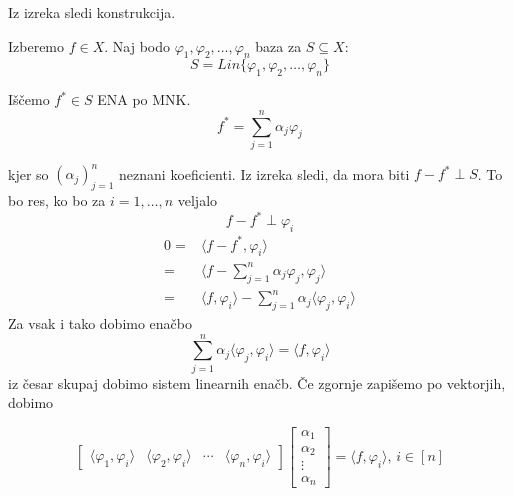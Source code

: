 \documentclass[a4paper,12pt]{article}
\newcommand{\innerproduct}[2]{\langle #1, #2 \rangle}
\theoremstyle{definition}
\theoremstyle{remark}
\begin{document}
Iz izreka sledi konstrukcija.

Izberemo $f \in X$. Naj bodo $\varphi_1, \varphi_2, \dots, \varphi_n$ baza za $S \subseteq X$:
\begin{equation*}
    S = Lin\{\varphi_1, \varphi_2, \dots, \varphi_n\}
\end{equation*}

Iščemo $f^* \in S$ ENA po MNK.
\begin{equation*}
    f^* = \sum_{j = 1}^{n} \alpha_j \varphi_j
\end{equation*}

kjer so $(\alpha_j)_{j = 1}^n$ neznani koeficienti. Iz izreka sledi, da mora biti $f - f^* \perp S$. To bo res, ko bo za $i = 1, \dots, n$ veljalo
\begin{equation*}
    f - f^* \perp \varphi_i
\end{equation*}
\begin{align*}
    0 =& \innerproduct{f - f^*}{\varphi_i}\\
      =& \innerproduct{f - \sum_{j = 1}^{n}\alpha_j \varphi_j}{\varphi_j}\\
      =& \innerproduct{f}{\varphi_i} - \sum_{j = 1}^{n}\alpha_j \innerproduct{\varphi_j}{\varphi_i}
\end{align*}
Za vsak i tako dobimo enačbo
\begin{equation*}
    \sum_{j = 1}^{n} \alpha_j \innerproduct{\varphi_j}{\varphi_i} = \innerproduct{f}{\varphi_i}
\end{equation*}
iz česar skupaj dobimo sistem linearnih enačb. Če zgornje zapišemo po vektorjih, dobimo

\begin{equation*}
    \begin{bmatrix}
        \innerproduct{\varphi_1}{\varphi_i} & \innerproduct{\varphi_2}{\varphi_i} & \cdots & \innerproduct{\varphi_n}{\varphi_i}
    \end{bmatrix}
    \begin{bmatrix}
        \alpha_1 \\
        \alpha_2 \\
        \vdots \\
        \alpha_n
    \end{bmatrix}
    =
    \innerproduct{f}{\varphi_i} \text{, } i \in [n]
\end{equation*}
\end{document}
